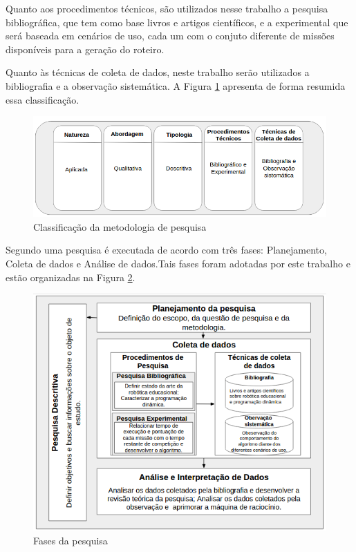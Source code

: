 Quanto aos procedimentos técnicos, são utilizados nesse trabalho a pesquisa bibliográfica, que tem como base livros e artigos científicos, e a experimental que será baseada em cenários de uso, cada um com o conjuto diferente de missões disponíveis para a geração do roteiro.

Quanto às técnicas de coleta de dados, neste trabalho serão utilizados a bibliografia e a observação sistemática. A Figura \ref{metodologiaPesquisa} apresenta de forma resumida essa classificação.


\FloatBarrier
\begin{figure}[!h]
\centering
\includegraphics[keepaspectratio=true,scale=0.5]{figuras/metodologiaPesquisa.png}
\caption{Classificação da metodologia de pesquisa}
\label{metodologiaPesquisa}
\end{figure}

Segundo  uma pesquisa é executada de acordo com três fases: Planejamento, Coleta de dados e Análise de dados.Tais fases foram adotadas por este trabalho e estão organizadas na Figura \ref{fasesPesquisa}.
\clearpage

\FloatBarrier
\begin{figure}[!h]
\centering
\includegraphics[keepaspectratio=true,scale=0.8]{figuras/fasesPesquisa.png}
\caption{Fases da pesquisa}
\label{fasesPesquisa}
\end{figure}

